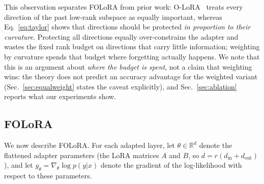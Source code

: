 This observation separates FOLoRA from prior work: O-LoRA~\cite{wang2023olora}
treats every direction of the past low-rank subspace as equally important, whereas
Eq.~\eqref{eq:taylor} shows that directions should be protected \emph{in proportion to
their curvature}. Protecting all directions equally over-constrains the adapter and
wastes the fixed rank budget on directions that carry little information; weighting by
curvature spends that budget where forgetting actually happens. We note that this is an
argument about \emph{where the budget is spent}, not a claim that weighting wins: the
theory does not predict an accuracy advantage for the weighted variant
(Sec.~\ref{sec:equalweight} states the caveat explicitly), and Sec.~\ref{sec:ablation}
reports what our experiments show.

\subsection{FOLoRA}
\label{sec:folora}

We now describe FOLoRA. For each adapted layer, let $\theta\in\mathbb{R}^{d}$ denote the
flattened adapter parameters (the LoRA matrices $A$ and $B$, so $d=r(d_{\text{in}}+d_{\text{out}})$),
and let $g_{\theta}=\nabla_{\theta}\log p(y|x)$ denote the gradient of the log-likelihood
with respect to these parameters.

